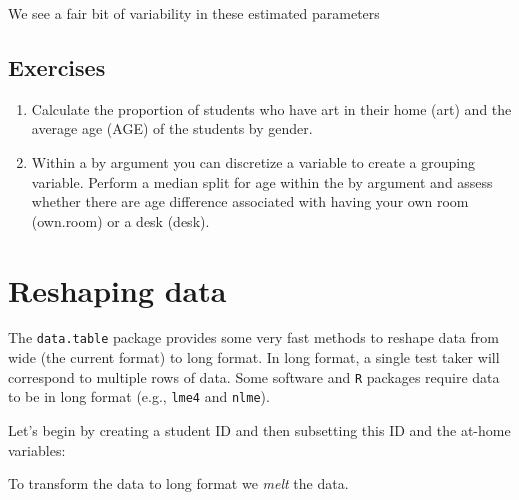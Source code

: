 \documentclass[
]{book}
\newenvironment{Shaded}{\begin{snugshade}}{\end{snugshade}}
\newcommand{\AttributeTok}[1]{\textcolor[rgb]{0.77,0.63,0.00}{#1}}
\newcommand{\DecValTok}[1]{\textcolor[rgb]{0.00,0.00,0.81}{#1}}
\newcommand{\FunctionTok}[1]{\textcolor[rgb]{0.00,0.00,0.00}{#1}}
\newcommand{\NormalTok}[1]{#1}
\newcommand{\OtherTok}[1]{\textcolor[rgb]{0.56,0.35,0.01}{#1}}
\newcommand{\SpecialCharTok}[1]{\textcolor[rgb]{0.00,0.00,0.00}{#1}}
\begin{document}
We see a fair bit of variability in these estimated parameters

\hypertarget{exercises-3}{%
\subsection{Exercises}\label{exercises-3}}

\begin{enumerate}
\def\labelenumi{\arabic{enumi}.}
\item
  Calculate the proportion of students who have art in their home (art) and the average age (AGE) of the students by gender.
\item
  Within a by argument you can discretize a variable to create a grouping variable. Perform a median split for age within the by argument and assess whether there are age difference associated with having your own room (own.room) or a desk (desk).
\end{enumerate}

\hypertarget{reshaping-data}{%
\section{Reshaping data}\label{reshaping-data}}

The \texttt{data.table} package provides some very fast methods to reshape data from wide (the current format) to long format. In long format, a single test taker will correspond to multiple rows of data. Some software and \texttt{R} packages require data to be in long format (e.g., \texttt{lme4} and \texttt{nlme}).

Let's begin by creating a student ID and then subsetting this ID and the at-home variables:

\begin{Shaded}
\end{Shaded}

To transform the data to long format we \emph{melt} the data.
\end{document}
